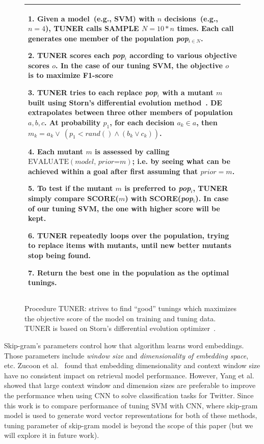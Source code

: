 \documentclass[sigconf]{acmart}
\theoremstyle{break}
\begin{document}
\begin{figure}[!htp]\small
     \begin{tabular}{|p{.95\linewidth}|}\hline
      1. Given a model~(e.g., SVM) with $n$ decisions~(e.g., $n=4$),
      TUNER calls SAMPLE $N=10*n$ times.
      Each call generates one member of the population {\em pop$_{i\in N}$}.

      2. TUNER scores each {\em pop}$_i$ according to various objective
      scores $o$. In the case of our tuning SVM, the objective $o$ is to maximize
     {F1-score}

     3. TUNER tries to each replace {\em pop}$_i$ with a mutant $m$
     built using Storn's differential evolution method~\cite{storn1997differential}.
     DE extrapolates between three other members of population $a,b,c$.
     At probability $p_1$, for each decision $a_k \in a$, then
     $m_k= a_k \vee ~(p_1 < \mathit{rand}() \wedge( b_k \vee c_k))$.

     4. Each mutant $m$ is assessed by calling  $\text{EVALUATE}(\textit{model, prior=m})$;
     i.e. by seeing what can be achieved within a goal after first assuming
     that $\textit{prior}=m$.

     5. To test if the mutant $m$ is preferred to {\em pop}$_i$, TUNER simply
      compare SCORE($m$) with SCORE({\em pop}$_i$). In case of our tuning SVM,
      the one with higher score will be kept.

    6. TUNER repeatedly loops over the population, trying to replace  items with mutants, until new better mutants stop being found.

    7. Return the best one in the population as the optimal tunings.
    \\\hline
    \end{tabular}
    \caption{Procedure TUNER: strives to find ``good'' tunings which maximizes
     the objective score of the model on training and tuning data. TUNER is based on Storn's differential evolution optimizer~\cite{storn1997differential}.}
    \label{fig:optimize}
\end{figure}





Skip-gram's parameters control how that algorithm
  learns   word embeddings. Those parameters include
  {\it window size} and {\it dimensionality of embedding space}, etc. 
Zucoon et al.~\cite{zuccon2015integrating} found that embedding dimensionality
and context window size have no consistent impact on retrieval model performance. However,
Yang et al.~\cite{yang2016using} showed that large context window and dimension
 sizes are preferable to improve the performance when using CNN to solve  classification tasks
 for Twitter. Since this work is to compare performance of  tuning SVM  with CNN, where
 skip-gram model is used to generate word vector representations for both of these methods, 
 tuning parameter of skip-gram model is beyond the scope of this paper 
 (but we will explore it in future work).
 
\end{document}
